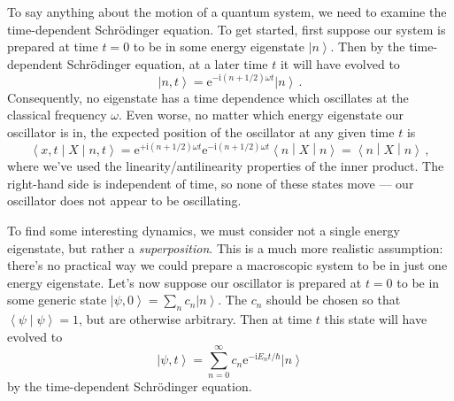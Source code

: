 \documentclass{article}
\theoremstyle{plain}\theoremheaderfont{\normalfont\itshape}\theorembodyfont{\rmfamily}\theoremseparator{.}\newtheorem*{rem}{Remark}\newtheorem*{ex}{Example}\newtheorem*{proof}{Proof}\newtheorem*{altp}{Alternative proof}
\theoremstyle{plain}\theoremheaderfont{\normalfont\bfseries}\theorembodyfont{\rmfamily}\theoremseparator{.}\newtheorem{thm}{Theorem}[section]\newtheorem{lem}[thm]{Lemma}\newtheorem{prop}[thm]{Proposition}\newtheorem*{cor}{Corollary}\newtheorem{defn}[thm]{Definition}\newtheorem{clm}[thm]{Claim}\newtheorem{clminproof}{Claim}
\theoremstyle{break}\theoremheaderfont{\normalfont\itshape}\theorembodyfont{\rmfamily}\theoremseparator{.\medskip}\newtheorem*{proofskip}{Proof}\newtheorem*{exs}{Examples}\newtheorem*{rems}{Remarks}
\theoremstyle{break}\theoremheaderfont{\normalfont\bfseries}\theorembodyfont{\rmfamily}\theoremseparator{.\medskip}\newtheorem{lemskip}[thm]{Lemma}\newtheorem{defnskip}[thm]{Definition}\newtheorem{propskip}[thm]{Proposition}\newtheorem{thmskip}[thm]{Theorem}
\numberwithin{equation}{section}
\newcommand{\ii}{\mathrm{i}}
\newcommand{\ee}{\mathrm{e}}
\newcommand{\ket}[1]{\left| #1 \right\rangle}
\newcommand{\braket}[2]{\left\langle #1 \middle| #2 \right\rangle}
\newcommand{\mel}[3]{\left\langle #1 \middle| #2 \middle| #3 \right\rangle}
\newcommand{\expval}[2]{\left\langle #2 \middle| #1 \middle| #2 \right\rangle}
\begin{document}
    To say anything about the motion of a quantum system, we need to examine the time-dependent Schr\"{o}dinger equation. To get started, first suppose our system is prepared at time \(t=0\) to be in some energy eigenstate \(\ket{n}\). Then by the time-dependent Schr\"{o}dinger equation, at a later time \(t\) it will have evolved to
    \begin{equation}
        \ket{n,t}=\ee^{-\ii (n+1/2)\omega t}\ket{n}\,.
    \end{equation}
    Consequently, no eigenstate has a time dependence which oscillates at the classical frequency \(\omega\). Even worse, no matter which energy eigenstate our oscillator is in, the expected position of the oscillator at any given time \(t\) is
    \begin{equation}
        \mel{x,t}{X}{n,t}=\ee^{+\ii (n+1/2)\omega t}\ee^{-\ii (n+1/2)\omega t}\expval{X}{n}=\expval{X}{n}\,,
    \end{equation}
    where we've used the linearity/antilinearity properties of the inner product. The right-hand side is independent of time, so none of these states move --- our oscillator does not appear to be oscillating.

    To find some interesting dynamics, we must consider not a single energy eigenstate, but rather a \textit{superposition}. This is a much more realistic assumption: there's no practical way we could prepare a macroscopic system to be in just one energy eigenstate. Let's now suppose our oscillator is prepared at \(t=0\) to be in some generic state \(\ket{\psi,0}=\sum_n c_n\ket{n}\). The \(c_n\) should be chosen so that \(\braket{\psi}{\psi}=1\), but are otherwise arbitrary. Then at time \(t\) this state will have evolved to
    \begin{equation}
        \ket{\psi,t}=\sum_{n=0}^{\infty}c_n \ee^{-\ii E_n t/\hbar}\ket{n}
    \end{equation}
    by the time-dependent Schr\"{o}dinger equation.
    
\end{document}
